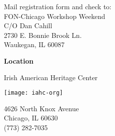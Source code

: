 \documentclass[12pt,letterpaper]{leaflet}
\begin{document}
\pagebreak

\begin{landscape}

\hspace*{15em}
\begin{minipage}[t]{\textwidth}
\vspace{0pt}
Mail registration form and check to:\\

\vspace*{1.5em}
{\large
FON-Chicago Workshop Weekend\\
C/O Dan Cahill\\
2730 E. Bonnie Brook Ln.\\ Waukegan, IL 60087
}
\end{minipage}
\end{landscape}

\pagebreak

\begin{flushleft}
{\Large \textbf{Location}}

\vspace*{1.5em}
{\large {Irish American Heritage Center}}
\end{flushleft}

\vspace*{0.45em}
\begin{center}
\texttt{[image: iahc-org]}
\end{center}

4626 North Knox Avenue\\
Chicago, IL 60630\\
(773) 282-7035
\end{document}
